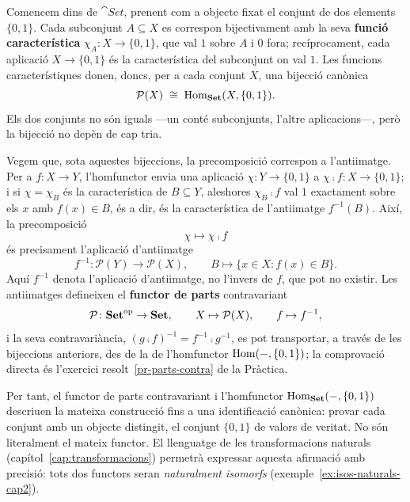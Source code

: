 \begin{exemple}\label{ex:functor-parts}
Comencem dins de $\cat{Set}$, prenent com a objecte fixat el conjunt de dos elements $\{0,1\}$. Cada subconjunt $A\subseteq X$ es correspon bijectivament amb la seva \textbf{funció característica} $\chi_A\colon X\to\{0,1\}$, que val $1$ sobre $A$ i $0$ fora; recíprocament, cada aplicació $X\to\{0,1\}$ és la característica del subconjunt on val $1$. Les funcions característiques donen, doncs, per a cada conjunt $X$, una bijecció canònica
\[
\mathcal P(X)\;\cong\;\operatorname{Hom}_{\mathbf{Set}}(X,\{0,1\}).
\]
Els dos conjunts no són iguals ---un conté subconjunts, l'altre aplicacions---, però la bijecció no depèn de cap tria.

Vegem que, sota aquestes bijeccions, la precomposició correspon a l'antiimatge. Per a $f\colon X\to Y$, l'homfunctor envia una aplicació $\chi\colon Y\to\{0,1\}$ a $\chi\comp f\colon X\to\{0,1\}$; i si $\chi=\chi_B$ és la característica de $B\subseteq Y$, aleshores $\chi_B\comp f$ val $1$ exactament sobre els $x$ amb $f(x)\in B$, és a dir, és la característica de l'antiimatge $f^{-1}(B)$. Així, la precomposició
\[
\chi\longmapsto\chi\comp f
\]
és precisament l'aplicació d'antiimatge
\[
f^{-1}\colon\mathcal P(Y)\to\mathcal P(X),
\qquad
B\mapsto\{x\in X : f(x)\in B\}.
\]
Aquí $f^{-1}$ denota l'aplicació d'antiimatge, no l'invers de $f$, que pot no existir. Les antiimatges defineixen el \textbf{functor de parts} contravariant
\[
\mathcal P\colon\mathbf{Set}^{\mathrm{op}}\to\mathbf{Set},\qquad X\mapsto\mathcal P(X),\qquad f\mapsto f^{-1},
\]
i la seva contravariància, $(g\comp f)^{-1}=f^{-1}\comp g^{-1}$, es pot transportar, a través de les bijeccions anteriors, des de la de l'homfunctor $\operatorname{Hom}(-,\{0,1\})$; la comprovació directa és l'exercici resolt~\ref{pr-parts-contra} de la Pràctica.

Per tant, el functor de parts contravariant i l'homfunctor $\operatorname{Hom}_{\mathbf{Set}}(-,\{0,1\})$ descriuen la mateixa construcció fins a una identificació canònica: provar cada conjunt amb un objecte distingit, el conjunt $\{0,1\}$ de valors de veritat. No són literalment el mateix functor. El llenguatge de les transformacions naturals (capítol~\ref{cap:transformacions}) permetrà expressar aquesta afirmació amb precisió: tots dos functors seran \emph{naturalment isomorfs} (exemple~\ref{ex:isos-naturals-cap2}).


\end{exemple}
